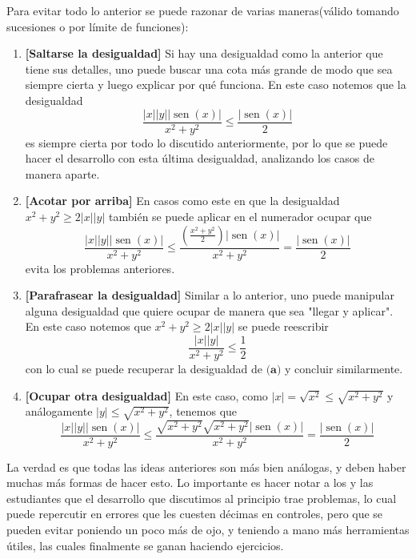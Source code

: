 \documentclass[letterpaper,11pt]{article}
\DeclareMathOperator{\sen}{sen}
\newcommand{\vabs}[1]{\lvert #1\rvert}
\begin{document}
\begin{enumerate}
Para evitar todo lo anterior se puede razonar de varias maneras(válido tomando sucesiones o por límite de funciones):
\begin{enumerate}
    \item \textbf{[Saltarse la desigualdad]} Si hay una desigualdad como la anterior que tiene sus detalles, uno puede buscar una cota más grande de modo que sea siempre cierta y luego explicar por qué funciona. En este caso notemos que la desigualdad 
    \[\frac{\vabs{x}\vabs{y}\vabs{\sen(x)}}{x^2+y^2}\leq\frac{\vabs{\sen(x)}}{2}\]
    es siempre cierta por todo lo discutido anteriormente, por lo que se puede hacer el desarrollo con esta última desigualdad, analizando los casos de manera aparte.
    \item \textbf{[Acotar por arriba]}
    En casos como este en que la desigualdad $x^2+y^2\geq2\vabs{x}\vabs{y}$ también se puede aplicar en el numerador ocupar que
    \[\frac{\vabs{x}\vabs{y}\vabs{\sen(x)}}{x^2+y^2}\leq\frac{\left(\frac{x^2+y^2}{2}\right)\vabs{\sen(x)}}{x^2+y^2}=\frac{\vabs{\sen(x)}}{2}\]
    evita los problemas anteriores.
    \item \textbf{[Parafrasear la desigualdad]} Similar a lo anterior, uno puede manipular alguna desigualdad que quiere ocupar de manera que sea "llegar y aplicar". En este caso notemos que $x^2+y^2\geq2\vabs{x}\vabs{y}$ se puede reescribir 
    \[\frac{\vabs{x}\vabs{y}}{x^2+y^2}\leq\frac{1}{2}\]
    con lo cual se puede recuperar la desigualdad de $\textbf{(a)}$ y concluir similarmente.
    \item \textbf{[Ocupar otra desigualdad]} En este caso, como $\vabs{x}=\sqrt{x^2}\leq\sqrt{x^2+y^2}$ y análogamente $\vabs{y}\leq\sqrt{x^2+y^2}$, tenemos que
    \[\frac{\vabs{x}\vabs{y}\vabs{\sen(x)}}{x^2+y^2}\leq\frac{\sqrt{x^2+y^2}\sqrt{x^2+y^2}\vabs{\sen(x)}}{x^2+y^2}=\frac{\vabs{\sen(x)}}{2}\]
\end{enumerate}

La verdad es que todas las ideas anteriores son más bien análogas, y deben haber muchas más formas de hacer esto. Lo importante es hacer notar a los y las estudiantes que el desarrollo que discutimos al principio trae problemas, lo cual puede repercutir en errores que les cuesten décimas en controles, pero que se pueden evitar poniendo un poco más de ojo, y teniendo a mano más herramientas útiles, las cuales finalmente se ganan haciendo ejercicios.
\end{enumerate}
\end{document}
